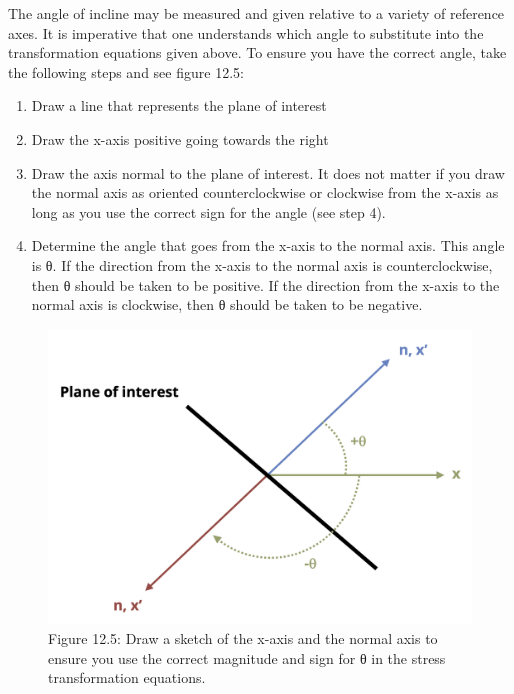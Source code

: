 \documentclass[
  letterpaper,
  DIV=11,
  numbers=noendperiod]{scrreprt}
\theoremstyle{definition}
\theoremstyle{remark}
\begin{document}
The angle of incline may be measured and given relative to a variety of
reference axes. It is imperative that one understands which angle to
substitute into the transformation equations given above. To ensure you
have the correct angle, take the following steps and see figure 12.5:

\begin{enumerate}
\def\labelenumi{\arabic{enumi}.}
\item
  Draw a line that represents the plane of interest
\item
  Draw the x-axis positive going towards the right
\item
  Draw the axis normal to the plane of interest. It does not matter if
  you draw the normal axis as oriented counterclockwise or clockwise
  from the x-axis as long as you use the correct sign for the angle (see
  step 4).
\item
  Determine the angle that goes from the x-axis to the normal axis. This
  angle is θ. If the direction from the x-axis to the normal axis is
  counterclockwise, then θ should be taken to be positive. If the
  direction from the x-axis to the normal axis is clockwise, then θ
  should be taken to be negative.
\end{enumerate}

\begin{figure}[H]

{\centering \includegraphics[width=4.77083in,height=\textheight]{images/CH12 figures/figure 12.5.png}

}

\caption{Figure 12.5: Draw a sketch of the x-axis and the normal axis to
ensure you use the correct magnitude and sign for θ in the stress
transformation equations.}

\end{figure}%
\end{document}
